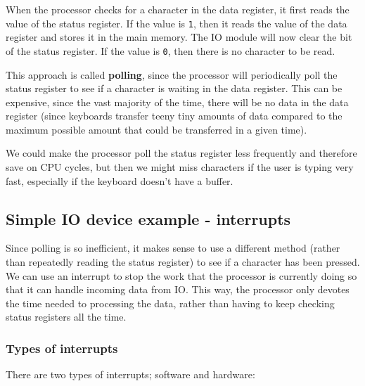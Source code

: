 When the processor checks for a character in the data register, it first reads
the value of the status register. If the value is \texttt{1}, then it reads the
value of the data register and stores it in the main memory. The IO module will
now clear the bit of the status register. If the value is \texttt{0}, then there
is no character to be read.

This approach is called \textbf{polling}, since the processor will periodically
poll the status register to see if a character is waiting in the data register.
This can be expensive, since the vast majority of the time, there will be no
data in the data register (since keyboards transfer teeny tiny amounts of data
compared to the maximum possible amount that could be transferred in a given
time).

We could make the processor poll the status register less frequently and
therefore save on CPU cycles, but then we might miss characters if the user is
typing very fast, especially if the keyboard doesn't have a buffer.

\subsection{Simple IO device example - interrupts}

Since polling is so inefficient, it makes sense to use a different method
(rather than repeatedly reading the status register) to see if a character has
been pressed. We can use an interrupt to stop the work that the processor is
currently doing so that it can handle incoming data from IO. This way, the
processor only devotes the time needed to processing the data, rather than
having to keep checking status registers all the time.

\subsubsection{Types of interrupts}

There are two types of interrupts; software and hardware:

